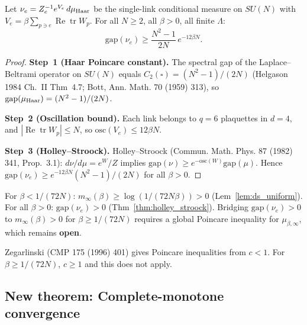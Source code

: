 \begin{theorem}
\label{thm:holley_stroock}
Let $\nu_e = Z_e^{-1}e^{V_e}\,d\mu_{\rm Haar}$ be the single-link conditional
measure on $SU(N)$ with $V_e = \beta\sum_{p\ni e}\operatorname{Re}\operatorname{tr}W_p$.
For all $N\ge 2$, all $\beta>0$, all finite $\Lambda$:
\begin{equation}
  \mathrm{gap}(\nu_e)\ge\frac{N^2-1}{2N}\,e^{-12\beta N}.
\end{equation}
\end{theorem}
\begin{proof}
\textbf{Step~1 (Haar Poincare constant).}
The spectral gap of the Laplace--Beltrami operator on $SU(N)$
equals $C_2(\square)=(N^2-1)/(2N)$
(Helgason 1984 Ch.~II Thm~4.7; Bott, Ann. Math. 70 (1959) 313),
so $\mathrm{gap}(\mu_{\rm Haar})=(N^2-1)/(2N)$.

\textbf{Step~2 (Oscillation bound).}
Each link belongs to $q=6$ plaquettes in $d=4$,
and $|\operatorname{Re}\operatorname{tr}W_p|\le N$,
so $\mathrm{osc}(V_e)\le 12\beta N$.

\textbf{Step~3 (Holley--Stroock).}
Holley--Stroock (Commun. Math. Phys. 87 (1982) 341, Prop.~3.1):
$d\nu/d\mu=e^W/Z$ implies $\mathrm{gap}(\nu)\ge e^{-\mathrm{osc}(W)}\mathrm{gap}(\mu)$.
Hence $\mathrm{gap}(\nu_e)\ge e^{-12\beta N}(N^2-1)/(2N)$ for all $\beta>0$.
\end{proof}

\begin{corollary}
\label{cor:hs_zeg}
For $\beta<1/(72N)$: $m_\infty(\beta)\ge\log(1/(72N\beta))>0$ (Lem~\ref{lem:ds_uniform}).
For all $\beta>0$: $\mathrm{gap}(\nu_e)>0$ (Thm~\ref{thm:holley_stroock}).
Bridging $\mathrm{gap}(\nu_e)>0$ to $m_\infty(\beta)>0$ for $\beta\ge 1/(72N)$
requires a global Poincare inequality for $\mu_{\beta,\infty}$, which remains \textbf{open}.
\end{corollary}

\begin{remark}
Zegarlinski (CMP 175 (1996) 401) gives Poincare inequalities from $c<1$.
For $\beta\ge 1/(72N)$, $c\ge 1$ and this does not apply.
\end{remark}

\subsection{New theorem: Complete-monotone convergence}
\label{ssec:inf_vol}

